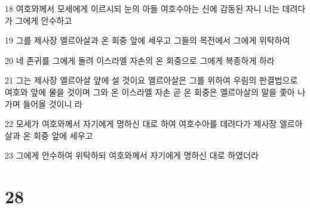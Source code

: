 \par 18 여호와께서 모세에게 이르시되 눈의 아들 여호수아는 신에 감동된 자니 너는 데려다가 그에게 안수하고
\par 19 그를 제사장 엘르아살과 온 회중 앞에 세우고 그들의 목전에서 그에게 위탁하여
\par 20 네 존귀를 그에게 돌려 이스라엘 자손의 온 회중으로 그에게 복종하게 하라
\par 21 그는 제사장 엘르아살 앞에 설 것이요 엘르아살은 그를 위하여 우림의 판결법으로 여호와 앞에 물을 것이며 그와 온 이스라엘 자손 곧 온 회중은 엘르아살의 말을 좇아 나가며 들어올 것이니 라
\par 22 모세가 여호와께서 자기에게 명하신 대로 하여 여호수아를 데려다가 제사장 엘르아살과 온 회중 앞에 세우고
\par 23 그에게 안수하여 위탁하되 여호와께서 자기에게 명하신 대로 하였더라

\chapter{28}

